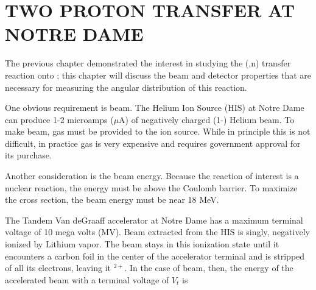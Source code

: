 %
%
%
%
%
%
%
%

%
%

\chapter{TWO PROTON TRANSFER AT NOTRE DAME}
\label{chap:2pExpt}

The previous chapter demonstrated the interest in studying the (,n) transfer reaction onto \GeTargets ; this chapter will discuss the beam and detector properties that are necessary for measuring the angular distribution of this reaction.

One obvious requirement is  beam.  The Helium Ion Source (HIS) at Notre Dame can produce 1-2 microamps ($\mu$A) of negatively charged (1-) Helium beam.  To make  beam,  gas must be provided to the ion source.  While in principle this is not difficult, in practice  gas is very expensive and requires government approval for its purchase.  

Another consideration is the beam energy.  Because the reaction of interest is a nuclear reaction, the energy must be above the Coulomb barrier.  To maximize the cross section, the beam energy must be near 18 MeV.

The Tandem Van deGraaff accelerator at Notre Dame has a maximum terminal voltage of 10 mega volts (MV).  Beam extracted from the HIS is singly, negatively ionized by Lithium vapor.  The beam stays in this ionization state until it encounters a carbon foil in the center of the accelerator terminal and is stripped of all its electrons, leaving it $^{2+}$.  In the case of  beam, then, the energy of the accelerated beam with a terminal voltage of $V_t$ is 

